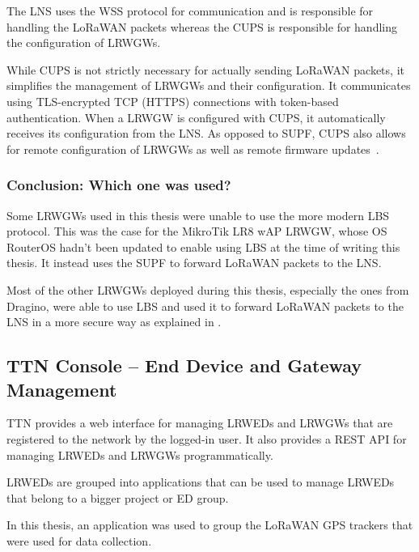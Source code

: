 The \ac{LNS} uses the \ac{WSS} protocol for communication and is responsible for handling the \ac{LoRaWAN} packets whereas the \ac{CUPS} is responsible for handling the configuration of \aclp{LRWGW}.

While \ac{CUPS} is not strictly necessary for actually sending \ac{LoRaWAN} packets, it simplifies the management of \aclp{LRWGW} and their configuration.
It communicates using \ac{TLS}-encrypted \ac{TCP} (\ac{HTTPS}) connections with token-based authentication.
When a \acl{LRWGW} is configured with \ac{CUPS}, it automatically receives its configuration from the \ac{LNS}.
As opposed to \ac{SUPF}, \ac{CUPS} also allows for remote configuration of \aclp{LRWGW} as well as remote firmware updates~\cite{the_things_industries_bv_lora_2022}.

\subsubsection{Conclusion: Which one was used?}

Some \aclp{LRWGW} used in this thesis were unable to use the more modern \acl{LBS} protocol.
This was the case for the MikroTik LR8 wAP \acl{LRWGW}, whose \ac{OS} RouterOS hadn't been updated to enable using \ac{LBS} at the time of writing this thesis.
It instead uses the \ac{SUPF} to forward \ac{LoRaWAN} packets to the \ac{LNS}.

Most of the other \aclp{LRWGW} deployed during this thesis, especially the ones from Dragino, were able to use \ac{LBS} and used it to forward \ac{LoRaWAN} packets to the \ac{LNS} in a more secure way as explained in .

\subsection{\acl{TTN} Console – End Device and Gateway Management}\label{sec:web-interface-and-device-gateway-management}

\ac{TTN} provides a web interface for managing \aclp{LRWED} and \aclp{LRWGW} that are registered to the network by the logged-in user.
It also provides a \ac{REST} \ac{API} for managing \aclp{LRWED} and \aclp{LRWGW} programmatically.

\aclp{LRWED} are grouped into applications that can be used to manage \aclp{LRWED} that belong to a bigger project or \acl{ED} group.

In this thesis, an application was used to group the \ac{LoRaWAN} \ac{GPS} trackers that were used for data collection.

